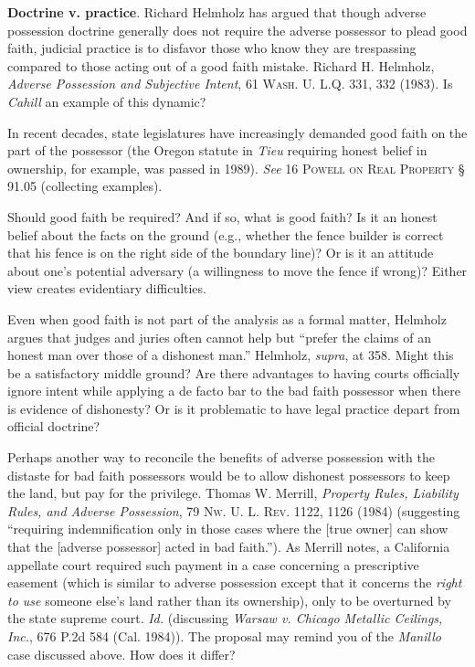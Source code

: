 \item \textbf{Doctrine v. practice}. Richard Helmholz has argued that
though adverse possession doctrine generally does not require the adverse
possessor to plead good faith, judicial practice is to disfavor those who know
they are trespassing compared to those acting out of a good faith mistake.
Richard H. Helmholz, \textit{Adverse Possession and Subjective Intent}, 61
\textsc{Wash. U. L.Q.} 331, 332 (1983). Is \textit{Cahill} an example of this
dynamic? 


In recent decades, state legislatures have increasingly demanded good faith on
the part of the possessor (the Oregon statute in \textit{Tieu} requiring honest
belief in ownership, for example, was passed in 1989). \textit{See} 16
\textsc{Powell on Real Property} {\S} 91.05 (collecting examples).

\item Should good faith be required? And if so, what is good faith? Is it an
honest belief about the facts on the ground (e.g., whether the fence builder is
correct that his fence is on the right side of the boundary line)? Or is it an
attitude about one's potential adversary (a willingness to move the fence if
wrong)? Either view creates evidentiary difficulties. 

Even when good faith is not part of the analysis as a formal matter, Helmholz
argues that judges and juries often cannot help but ``prefer the claims of an
honest man over those of a dishonest man.'' Helmholz, \textit{supra}, at 358.
Might this be a satisfactory middle ground? Are there advantages to having
courts officially ignore intent while applying a de facto bar to the bad faith
possessor when there is evidence of dishonesty? Or is it problematic to have
legal practice depart from official doctrine? 

Perhaps another way to reconcile the benefits of adverse possession with the
distaste for bad faith possessors would be to allow dishonest possessors to
keep the land, but pay for the privilege. Thomas W. Merrill, \textit{Property
Rules, Liability Rules, and Adverse Possession}, 79 \textsc{Nw. U. L. Rev}.
1122, 1126 (1984) (suggesting ``requiring indemnification only in those cases
where the [true owner] can show that the [adverse possessor] acted in bad
faith.''). As Merrill notes, a California appellate court required
such payment in a case concerning a prescriptive easement (which is similar to
adverse possession except that it concerns the \textit{right to use} someone
else's land rather than its ownership), only to be overturned by the state
supreme court. \textit{Id.} (discussing \emph{Warsaw v. Chicago Metallic
Ceilings, Inc.}, 676 P.2d 584 (Cal. 1984)). The proposal may remind you of the
\textit{Manillo} case discussed above. How does it differ? 

